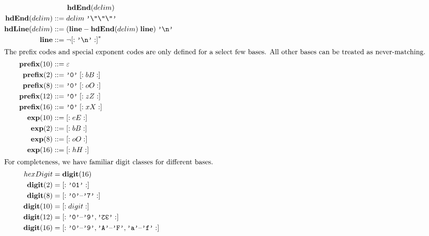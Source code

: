 \documentclass[11pt]{article} %
\newcommand*{\textturntwo}{\raisebox{-0.05ex}{\rotatebox[origin=c]{180}{2}}}
\newcommand*{\textturnthree}{\rotatebox[origin=c]{180}{3}}
\begin{document}
\begin{align*}
  &\qquad \mathbf{hdEnd}(delim) \\
\mathbf{hdEnd}(delim) &\gis delim \; \literal{\textbackslash"\textbackslash"\textbackslash"} \\
\mathbf{hdLine}(delim)
  &\gis (\mathbf{line} - \mathbf{hdEnd}(delim) \; \mathbf{line}) \; \literal{\textbackslash n} \\
\mathbf{line}
  &\gis \notcharclass{\literal{\textbackslash n}}^* \\
%
\intertext{The prefix codes and special exponent codes are only defined for a select few bases.
  All other bases can be treated as never-matching.
}
  \mathbf{prefix}(10) &\gis \varepsilon \\
  \mathbf{prefix}(2) &\gis \literal{0} \; \charclass{bB} \\
  \mathbf{prefix}(8) &\gis \literal{0} \; \charclass{oO} \\
  \mathbf{prefix}(12) &\gis \literal{0} \; \charclass{zZ} \\
  \mathbf{prefix}(16) &\gis \literal{0} \; \charclass{xX} \\
  \mathbf{exp}(10) &\gis \charclass{eE} \\
  \mathbf{exp}(2) &\gis \charclass{bB} \\
  \mathbf{exp}(8) &\gis \charclass{oO} \\
  \mathbf{exp}(16) &\gis \charclass{hH} \\
%
\intertext{For completeness, we have familiar digit classes for different bases.}
  hexDigit &= \mathbf{digit}(16) \\
  \mathbf{digit}(2) &= \charclass{\literal{01}} \\
  \mathbf{digit}(8) &= \charclass{\charrange{0}{7}} \\
  \mathbf{digit}(10) &= \charclass{digit} \\
  \mathbf{digit}(12) &= \charclass{\charrange{0}{9}, \literal{\textturntwo\textturnthree}} \\ %
  \mathbf{digit}(16) &= \charclass{\charrange{0}{9}, \charrange{A}{F}, \charrange{a}{f}}
\end{align*}
\end{document}
